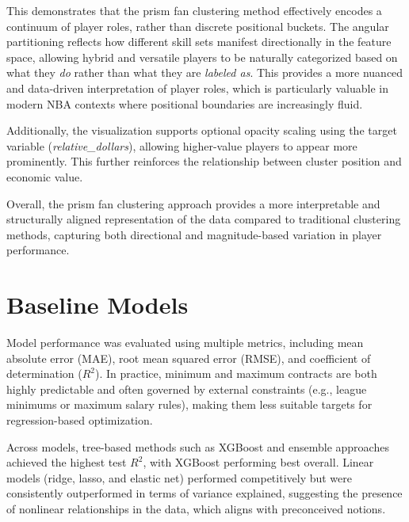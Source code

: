 \documentclass[conference]{IEEEtran}
\begin{document}
This demonstrates that the prism fan clustering method effectively encodes a continuum of player roles, rather than discrete positional buckets. The angular partitioning reflects how different skill sets manifest directionally in the feature space, allowing hybrid and versatile players to be naturally categorized based on what they \textit{do} rather than what they are \textit{labeled as}. This provides a more nuanced and data-driven interpretation of player roles, which is particularly valuable in modern NBA contexts where positional boundaries are increasingly fluid.

Additionally, the visualization supports optional opacity scaling using the target variable (\textit{relative\_dollars}), allowing higher-value players to appear more prominently. This further reinforces the relationship between cluster position and economic value.

Overall, the prism fan clustering approach provides a more interpretable and structurally aligned representation of the data compared to traditional clustering methods, capturing both directional and magnitude-based variation in player performance.
\section{Baseline Models}

Model performance was evaluated using multiple metrics, including mean absolute error (MAE), root mean squared error (RMSE), and coefficient of determination ($R^2$). In practice, minimum and maximum contracts are both highly predictable and often governed by external constraints (e.g., league minimums or maximum salary rules), making them less suitable targets for regression-based optimization.

\begin{table}[htbp]
    \centering
    \caption{Model Performance Comparison}
    
\end{table}

Across models, tree-based methods such as XGBoost and ensemble approaches achieved the highest test $R^2$, with XGBoost performing best overall. Linear models (ridge, lasso, and elastic net) performed competitively but were consistently outperformed in terms of variance explained, suggesting the presence of nonlinear relationships in the data, which aligns with preconceived notions.
\end{document}
